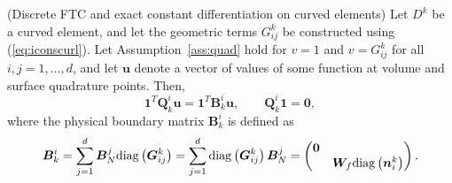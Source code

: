\documentclass{svjour3}                     %
\newcommand{\diag}[1]{{\rm diag}\LRp{#1}}
\newcommand{\LRp}[1]{\left( #1 \right)}
\begin{document}
\begin{lemma}{(Discrete FTC and exact constant differentiation on curved elements)}
\label{lemma:vdsbpcurved} 
Let $D^k$ be a curved element, and let the geometric terms $G^k_{ij}$ be constructed using (\ref{eq:iconscurl}).  Let Assumption~\ref{ass:quad} hold for $v = 1$ and $v = G^k_{ij}$ for all $i,j = 1,\ldots, d$, and let $\bm{u}$ denote a vector of values of some function at volume and surface quadrature points.  Then, 
\[
\bm{1}^T\bm{Q}^i_k\bm{u} = \bm{1}^T\bm{B}^i_k\bm{u}, \qquad \bm{Q}^i_k\bm{1} = \bm{0},
\]
where the physical boundary matrix $\bm{B}^i_k$ is defined as
\[
\bm{B}^i_k = \sum_{j=1}^d \bm{B}^j_N \diag{\bm{G}^k_{ij}} = \sum_{j=1}^d \diag{\bm{G}^k_{ij}}\bm{B}^j_N  = \begin{pmatrix}
\bm{0}&\\
& \bm{W}_f \diag{\bm{n}^k_i}\end{pmatrix}.
\]
\end{lemma}
\end{document}
